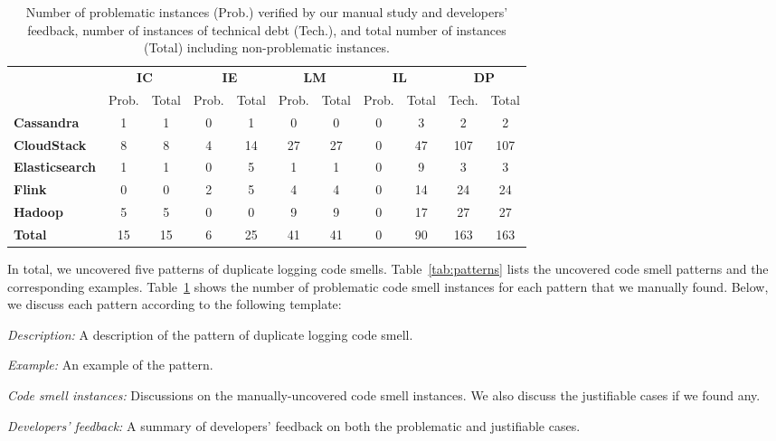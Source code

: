 \begin{table}
    \caption{Number of problematic instances ({\sf Prob.}) verified by our manual study and developers' feedback, number of instances of technical debt ({\sf Tech.}), and total number of instances (Total) including non-problematic instances.\label{tab:manual}}
	\vspace{-0.3cm}
    \centering
    \tabcolsep=1pt
    \begin{tabular}{lcc|cc|cc|cc|cc}

        \toprule
        & \multicolumn{2}{c|}{\textbf{IC}} & \multicolumn{2}{c|}{\textbf{IE}} & \multicolumn{2}{c|}{\textbf{LM}} & \multicolumn{2}{c|}{\textbf{IL }} & \multicolumn{2}{c}{\textbf{DP}}\\
        & Prob.  & Total & Prob. &Total& Prob.  &Total& Prob. &Total& Tech.  &Total\\
        \midrule
        \textbf{Cassandra}     & 1  & 1 & 0  & 1 & 0  & 0 & 0 & 3 & 2  & 2 \\
        \textbf{CloudStack}    & 8  & 8 & 4  & 14 & 27  & 27 & 0 & 47 & 107 & 107 \\
        \textbf{Elasticsearch} & 1  & 1 & 0  & 5 & 1  & 1 & 0 & 9 & 3  & 3 \\
        \textbf{Flink}        & 0  & 0 & 2  & 5 & 4  & 4 & 0 & 14 & 24  & 24 \\
        \textbf{Hadoop}        & 5  & 5 & 0  & 0 & 9  & 9 & 0 & 17 & 27  & 27 \\

        \midrule
        \textbf{Total}         & 15  & 15 & 6 & 25 & 41  & 41 & 0  & 90 & 163\tnote{1}  & 163 \\


        \bottomrule
    \end{tabular}

	\vspace{-0.6cm}

\end{table}



 In total, we uncovered five patterns of duplicate logging code smells. Table~\ref{tab:patterns} lists the uncovered code smell patterns and the corresponding examples. Table~\ref{tab:manual} shows the number of problematic code smell instances for each pattern that we manually found.
Below, we discuss each pattern according to the following template:


\begin{LaTeXdescription}
  \item[{\em Description:}] A description of the pattern of duplicate logging code smell.
  \item[{\em Example:}] An example of the pattern.
  \item[{\em Code smell instances:}] Discussions on the manually-uncovered code smell instances. We also discuss the justifiable cases if we found any.
  \item[{\em Developers' feedback:}] A summary of developers' feedback on both the problematic and justifiable cases.

\end{LaTeXdescription}



